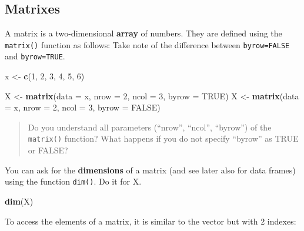 \documentclass[
]{book}
\newenvironment{Shaded}{\begin{snugshade}}{\end{snugshade}}
\newcommand{\AttributeTok}[1]{\textcolor[rgb]{0.13,0.29,0.53}{#1}}
\newcommand{\ConstantTok}[1]{\textcolor[rgb]{0.56,0.35,0.01}{#1}}
\newcommand{\DecValTok}[1]{\textcolor[rgb]{0.00,0.00,0.81}{#1}}
\newcommand{\FunctionTok}[1]{\textcolor[rgb]{0.13,0.29,0.53}{\textbf{#1}}}
\newcommand{\NormalTok}[1]{#1}
\newcommand{\OtherTok}[1]{\textcolor[rgb]{0.56,0.35,0.01}{#1}}
\begin{document}
\hypertarget{matrixes}{%
\subsection*{Matrixes}\label{matrixes}}

A matrix is a two-dimensional \textbf{array} of numbers.
They are defined using the \texttt{matrix()} function as follows: Take note of the difference between \texttt{byrow=FALSE} and \texttt{byrow=TRUE}.

\begin{Shaded}
\begin{Highlighting}[]
\NormalTok{x }\OtherTok{\textless{}{-}} \FunctionTok{c}\NormalTok{(}\DecValTok{1}\NormalTok{, }\DecValTok{2}\NormalTok{, }\DecValTok{3}\NormalTok{, }\DecValTok{4}\NormalTok{, }\DecValTok{5}\NormalTok{, }\DecValTok{6}\NormalTok{)}

\NormalTok{X }\OtherTok{\textless{}{-}} \FunctionTok{matrix}\NormalTok{(}\AttributeTok{data =}\NormalTok{ x, }\AttributeTok{nrow =} \DecValTok{2}\NormalTok{, }\AttributeTok{ncol =} \DecValTok{3}\NormalTok{, }\AttributeTok{byrow =} \ConstantTok{TRUE}\NormalTok{)}
\NormalTok{X }\OtherTok{\textless{}{-}} \FunctionTok{matrix}\NormalTok{(}\AttributeTok{data =}\NormalTok{ x, }\AttributeTok{nrow =} \DecValTok{2}\NormalTok{, }\AttributeTok{ncol =} \DecValTok{3}\NormalTok{, }\AttributeTok{byrow =} \ConstantTok{FALSE}\NormalTok{)}
\end{Highlighting}
\end{Shaded}

\begin{quote}
Do you understand all parameters (``nrow'', ``ncol'', ``byrow'') of the \texttt{matrix()} function?
What happens if you do not specify ``byrow'' as TRUE or FALSE?
\end{quote}

You can ask for the \textbf{dimensions} of a matrix (and see later also for data frames) using the function \texttt{dim()}.
Do it for X.

\begin{Shaded}
\begin{Highlighting}[]
\FunctionTok{dim}\NormalTok{(X)}
\end{Highlighting}
\end{Shaded}

To access the elements of a matrix, it is similar to the vector but with 2 indexes:
\end{document}
